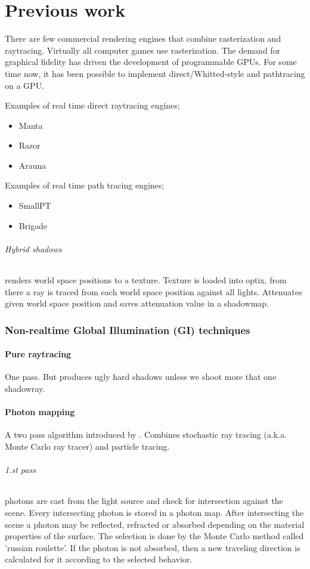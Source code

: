 \part{Previous work}

There are few commercial rendering engines that combine rasterization and raytracing. Virtually all computer games use rasterization. The demand for graphical fidelity has driven the development of programmable GPUs. For some time now, it has been possible to implement direct/Whitted-style and pathtracing on a GPU.

Examples of real time direct raytracing engines; 
\begin{itemize}
	\item Manta
	\item Razor
	\item Arauna
\end{itemize}

Examples of real time path tracing engines; 
\begin{itemize}
	\item SmallPT
	\item Brigade
\end{itemize}

\paragraph{Hybrid shadows} renders world space positions to a texture. Texture is loaded into optix, from there a ray is traced from each world space position against all lights. Attenuates given world space position and saves attenuation value in a shadowmap.

\section {Non-realtime Global Illumination (GI) techniques}
		\subsection{Pure raytracing} 
		One pass. But produces ugly hard shadows unless we shoot more that one shadowray.
	\subsection{Photon mapping} A two pass algorithm introduced by \cite{jensen95}. Combines stochastic ray tracing (a.k.a. Monte Carlo ray tracer) and particle tracing.
	\paragraph{1.st pass} photons are cast from the light source and check for intersection against the scene.    Every intersecting photon is stored in a photon map. After intersecting the scene a photon may be reflected, refracted or absorbed depending on the material properties of the surface. The selection is done by the Monte Carlo method called 'russian roulette'. If the photon is not absorbed, then a new traveling direction is calculated for it according to the selected behavior.

